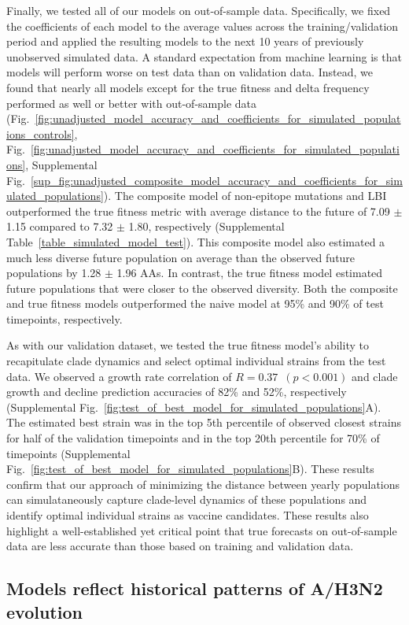 Finally, we tested all of our models on out-of-sample data.
Specifically, we fixed the coefficients of each model to the average values across the training/validation period and applied the resulting models to the next 10 years of previously unobserved simulated data.
A standard expectation from machine learning is that models will perform worse on test data than on validation data.
Instead, we found that nearly all models except for the true fitness and delta frequency performed as well or better with out-of-sample data (Fig.~\ref{fig:unadjusted_model_accuracy_and_coefficients_for_simulated_populations_controls}, Fig.~\ref{fig:unadjusted_model_accuracy_and_coefficients_for_simulated_populations}, Supplemental Fig.~\ref{sup_fig:unadjusted_composite_model_accuracy_and_coefficients_for_simulated_populations}).
The composite model of non-epitope mutations and LBI outperformed the true fitness metric with average distance to the future of 7.09 $\pm$ 1.15 compared to 7.32 $\pm$ 1.80, respectively (Supplemental Table~\ref{table_simulated_model_test}).
This composite model also estimated a much less diverse future population on average than the observed future populations by 1.28 $\pm$ 1.96 AAs.
In contrast, the true fitness model estimated future populations that were closer to the observed diversity.
Both the composite and true fitness models outperformed the naive model at 95\% and 90\% of test timepoints, respectively.

As with our validation dataset, we tested the true fitness model's ability to recapitulate clade dynamics and select optimal individual strains from the test data.
We observed a growth rate correlation of $R = 0.37$~$(p < 0.001)$ and clade growth and decline prediction accuracies of 82\% and 52\%, respectively (Supplemental Fig.~\ref{fig:test_of_best_model_for_simulated_populations}A).
The estimated best strain was in the top 5th percentile of observed closest strains for half of the validation timepoints and in the top 20th percentile for 70\% of timepoints (Supplemental Fig.~\ref{fig:test_of_best_model_for_simulated_populations}B).
These results confirm that our approach of minimizing the distance between yearly populations can simulataneously capture clade-level dynamics of these populations and identify optimal individual strains as vaccine candidates.
These results also highlight a well-established yet critical point that true forecasts on out-of-sample data are less accurate than those based on training and validation data.

\subsection*{Models reflect historical patterns of A/H3N2 evolution}

